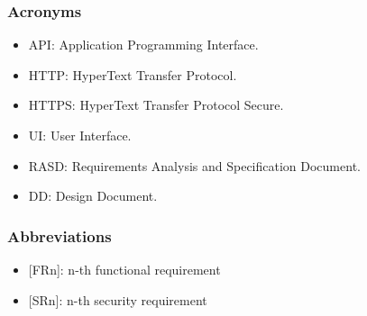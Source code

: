 \subsubsection{Acronyms}
\begin{itemize}
    \item API: Application Programming Interface.
    \item HTTP: HyperText Transfer Protocol.
    \item HTTPS: HyperText Transfer Protocol Secure.
    \item UI: User Interface.
    \item RASD: Requirements Analysis and Specification Document.
    \item DD: Design Document.
\end{itemize}

\subsubsection{Abbreviations}
\begin{itemize}
    \item {[FRn]}: n-th functional requirement
    \item {[SRn]}: n-th security requirement
\end{itemize}